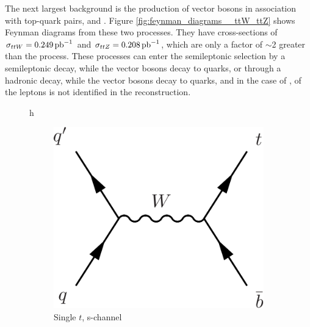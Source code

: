 \par The next largest background is the production of vector bosons in
association with top-quark pairs, \ttW and \ttZ.  Figure
\ref{fig:feynman_diagrams__ttW_ttZ} shows Feynman diagrams from these
two processes.  They have cross-sections of $\sigma_{ttW}=0.249\mbox{\ensuremath{\,\text{pb}^\text{$-$1}}}$
and $\sigma_{ttZ}=0.208\mbox{\ensuremath{\,\text{pb}^\text{$-$1}}}$, which are only a factor of $\sim$2
greater than the \ttH process.  These processes can enter the
semileptonic \ttH selection by a semileptonic \ttbar decay, while the
vector bosons decay to quarks, or through a hadronic \ttbar decay,
while the vector bosons decay to quarks, and in the case of \ttZ, of
the leptons is not identified in the reconstruction.  

\begin{figure}{h}
    \centering
    \begin{subfigure}[h]{0.3\textwidth}
        \includegraphics[width=\textwidth]{Figures/Feynman_Diagrams/backgrounds_singleT_sChan.pdf}
        \caption{Single $t$, s-channel}\label{fd:t_sChan}
      \end{subfigure}
      ~ %
      \begin{subfigure}[h]{0.3\textwidth}

\end{subfigure}
\end{figure}
